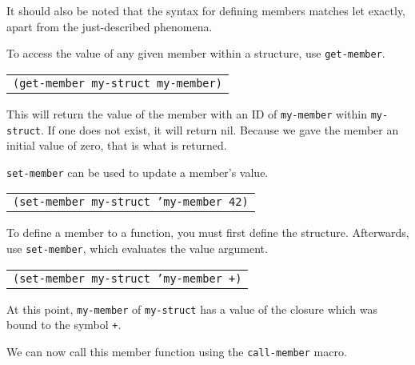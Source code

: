 \documentclass[
letterpaper,
oneside,
]{memoir}
\begin{document}
\vspace{1em}
\noindent
It should also be noted that the syntax for defining members matches let exactly, apart from the just-described phenomena.

\filbreak

\vspace{1em}
\noindent
To access the value of any given member within a structure, use \texttt{get-member}.

\vspace{1em}
\begin{tabular}{l}
  \texttt{(get-member my-struct my-member)} \\
\end{tabular}
\vspace{1em}

\noindent
This will return the value of the member with an ID of \texttt{my-member} within \texttt{my-struct}. If one does not exist, it will return nil. Because we gave the member an initial value of zero, that is what is returned.

\filbreak

\vspace{1em}
\noindent
\texttt{set-member} can be used to update a member’s value.

\vspace{1em}
\begin{tabular}{l}
  \texttt{(set-member my-struct 'my-member 42)} \\
\end{tabular}
\vspace{1em}

\filbreak

\noindent
To define a member to a function, you must first define the structure. Afterwards, use \texttt{set-member}, which evaluates the value argument.

\vspace{1em}
\begin{tabular}{l}
  \texttt{(set-member my-struct 'my-member +)} \\
\end{tabular}
\vspace{1em}

\noindent
At this point, \texttt{my-member} of \texttt{my-struct} has a value of the closure which was bound to the symbol \texttt{+}.

\filbreak

\vspace{1em}
\noindent
We can now call this member function using the \texttt{call-member} macro.
\end{document}
